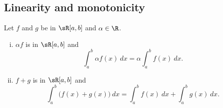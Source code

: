 \documentclass[12pt]{book}
\begin{document}
\subsection*{Linearity and monotonicity}

\begin{prop}[Linearity]
Let $f$ and $g$ be in $\sR[a,b]$ and $\alpha \in \R$.
\begin{enumerate}[(i)]
\item $\alpha f$ is in $\sR[a,b]$ and
\begin{equation*}
\int_a^b \alpha f(x) ~dx = \alpha \int_a^b f(x) ~dx .
\end{equation*}
\item $f+g$ is in $\sR[a,b]$ and
\begin{equation*}
\int_a^b \bigl( f(x)+g(x) \bigr) ~dx = 
\int_a^b f(x) ~dx 
+
\int_a^b g(x) ~dx .
\end{equation*}
\end{enumerate}
\end{prop}
\end{document}
